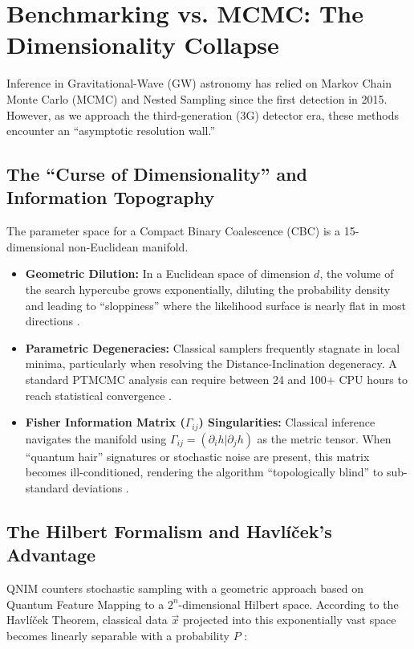 \documentclass[11pt,a4paper,spanish]{book}
\numberwithin{equation}{chapter}
\numberwithin{figure}{chapter}
\numberwithin{equation}{chapter}
\numberwithin{figure}{chapter}
\numberwithin{table}{chapter}
\begin{document}
\section{Benchmarking vs. MCMC: The Dimensionality Collapse}

Inference in Gravitational-Wave (GW) astronomy has relied on Markov Chain Monte Carlo (MCMC) and Nested Sampling since the first detection in 2015. However, as we approach the third-generation (3G) detector era, these methods encounter an ``asymptotic resolution wall.''

\subsection{The ``Curse of Dimensionality'' and Information Topography}

The parameter space for a Compact Binary Coalescence (CBC) is a 15-dimensional non-Euclidean manifold. 



\begin{itemize}
    \item \textbf{Geometric Dilution:} In a Euclidean space of dimension $d$, the volume of the search hypercube grows exponentially, diluting the probability density and leading to ``sloppiness'' where the likelihood surface is nearly flat in most directions \cite{arxiv250113846}.
    \item \textbf{Parametric Degeneracies:} Classical samplers frequently stagnate in local minima, particularly when resolving the Distance-Inclination degeneracy. A standard PTMCMC analysis can require between 24 and 100+ CPU hours to reach statistical convergence \cite{ictp_saifr_bayesian}.
    \item \textbf{Fisher Information Matrix ($\Gamma_{ij}$) Singularities:} Classical inference navigates the manifold using $\Gamma_{ij} = (\partial_i h | \partial_j h)$ as the metric tensor. When ``quantum hair'' signatures or stochastic noise are present, this matrix becomes ill-conditioned, rendering the algorithm ``topologically blind'' to sub-standard deviations \cite{ml_gw_apps}.
\end{itemize}

\subsection{The Hilbert Formalism and Havlíček’s Advantage}

QNIM counters stochastic sampling with a geometric approach based on Quantum Feature Mapping to a $2^n$-dimensional Hilbert space. According to the Havlíček Theorem, classical data $\vec{x}$ projected into this exponentially vast space becomes linearly separable with a probability $P$ \cite{arxiv251003389}:
\end{document}
